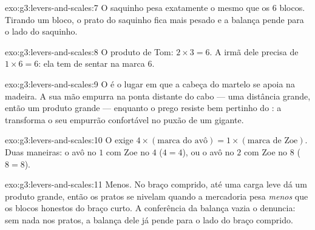 \begin{solution}{exo:g3:levers-and-scales:7}
O saquinho pesa exatamente o mesmo que os $6$ blocos. Tirando um
bloco, o prato do saquinho fica mais pesado e a balança pende para o
lado do saquinho.
\end{solution}

\begin{solution}{exo:g3:levers-and-scales:8}
O produto de Tom: $2 \times 3 = 6$. A irmã dele precisa de
$1 \times 6 = 6$: ela tem de sentar na marca $6$.
\end{solution}

\begin{solution}{exo:g3:levers-and-scales:9}
O  é o lugar em que a cabeça do martelo se apoia na
madeira. A sua mão empurra na ponta distante do cabo --- uma
distância grande, então um produto grande --- enquanto o prego
resiste bem pertinho do : a  transforma o seu
empurrão confortável no puxão de um gigante.
\end{solution}

\begin{solution}{exo:g3:levers-and-scales:10}
O  exige $4 \times (\text{marca do avô}) = 1 \times
(\text{marca de Zoe})$. Duas maneiras: o avô no $1$ com Zoe no $4$
($4 = 4$), ou o avô no $2$ com Zoe no $8$ ($8 = 8$).
\end{solution}

\begin{solution}{exo:g3:levers-and-scales:11}
Menos. No braço comprido, até uma carga leve dá um produto grande,
então os pratos se nivelam quando a mercadoria pesa \emph{menos} que
os blocos honestos do braço curto. A conferência da balança vazia o
denuncia: sem nada nos pratos, a balança dele já pende para o lado do
braço comprido.
\end{solution}

